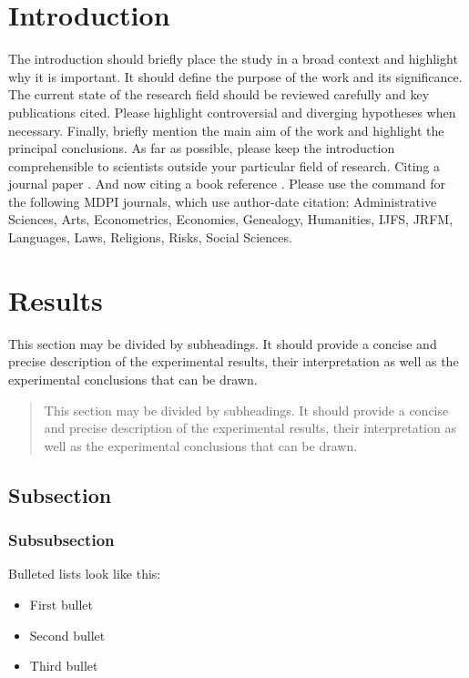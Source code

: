 \documentclass[materials,article,submit,moreauthors,pdftex]{Definitions/mdpi}
\begin{document}



\section{Introduction}
The introduction should briefly place the study in a broad context and highlight why it is important. It should define the purpose of the work and its significance. The current state of the research field should be reviewed carefully and key publications cited. Please highlight controversial and diverging hypotheses when necessary. Finally, briefly mention the main aim of the work and highlight the principal conclusions. As far as possible, please keep the introduction comprehensible to scientists outside your particular field of research. Citing a journal paper \cite{ref-journal}. And now citing a book reference \cite{ref-book}. Please use the command \citep{ref-journal} for the following MDPI journals, which use author-date citation: Administrative Sciences, Arts, Econometrics, Economies, Genealogy, Humanities, IJFS, JRFM, Languages, Laws, Religions, Risks, Social Sciences.
 
\section{Results}

This section may be divided by subheadings. It should provide a concise and precise description of the experimental results, their interpretation as well as the experimental conclusions that can be drawn.
\begin{quote}
This section may be divided by subheadings. It should provide a concise and precise description of the experimental results, their interpretation as well as the experimental conclusions that can be drawn.
\end{quote}

\subsection{Subsection}
\unskip
\subsubsection{Subsubsection}

Bulleted lists look like this:
\begin{itemize}[leftmargin=*,labelsep=5.8mm]
\item	First bullet
\item	Second bullet
\item	Third bullet
\end{itemize}
\end{document}
